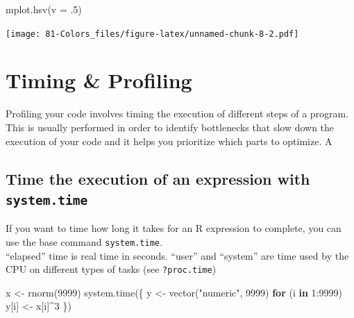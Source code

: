 \documentclass[
]{book}
\newenvironment{Shaded}{\begin{snugshade}}{\end{snugshade}}
\newcommand{\AttributeTok}[1]{\textcolor[rgb]{0.77,0.63,0.00}{#1}}
\newcommand{\ControlFlowTok}[1]{\textcolor[rgb]{0.13,0.29,0.53}{\textbf{#1}}}
\newcommand{\DecValTok}[1]{\textcolor[rgb]{0.00,0.00,0.81}{#1}}
\newcommand{\FunctionTok}[1]{\textcolor[rgb]{0.00,0.00,0.00}{#1}}
\newcommand{\NormalTok}[1]{#1}
\newcommand{\OtherTok}[1]{\textcolor[rgb]{0.56,0.35,0.01}{#1}}
\newcommand{\SpecialCharTok}[1]{\textcolor[rgb]{0.00,0.00,0.00}{#1}}
\newcommand{\StringTok}[1]{\textcolor[rgb]{0.31,0.60,0.02}{#1}}
\begin{document}
\begin{Shaded}
\begin{Highlighting}[]
\FunctionTok{mplot.hsv}\NormalTok{(}\AttributeTok{v =}\NormalTok{ .}\DecValTok{5}\NormalTok{)}
\end{Highlighting}
\end{Shaded}

\texttt{[image: 81-Colors\_files/figure-latex/unnamed-chunk-8-2.pdf]}

\hypertarget{profiling}{%
\chapter{Timing \& Profiling}\label{profiling}}

Profiling your code involves timing the execution of different steps of a program. This is usually performed in order to identify bottlenecks that slow down the execution of your code and it helps you prioritize which parts to optimize. A

\hypertarget{time-the-execution-of-an-expression-with-system.time}{%
\section{\texorpdfstring{Time the execution of an expression with \texttt{system.time}}{Time the execution of an expression with system.time}}\label{time-the-execution-of-an-expression-with-system.time}}

If you want to time how long it takes for an R expression to complete, you can use the base command \texttt{system.time}.\\
``elapsed'' time is real time in seconds. ``user'' and ``system'' are time used by the CPU on different types of tasks (see \texttt{?proc.time})

\begin{Shaded}
\begin{Highlighting}[]
\NormalTok{x }\OtherTok{\textless{}{-}} \FunctionTok{rnorm}\NormalTok{(}\DecValTok{9999}\NormalTok{)}
\FunctionTok{system.time}\NormalTok{(\{}
\NormalTok{    y }\OtherTok{\textless{}{-}} \FunctionTok{vector}\NormalTok{(}\StringTok{"numeric"}\NormalTok{, }\DecValTok{9999}\NormalTok{)}
    \ControlFlowTok{for}\NormalTok{ (i }\ControlFlowTok{in} \DecValTok{1}\SpecialCharTok{:}\DecValTok{9999}\NormalTok{) y[i] }\OtherTok{\textless{}{-}}\NormalTok{ x[i]}\SpecialCharTok{\^{}}\DecValTok{3}
\NormalTok{\})}
\end{Highlighting}
\end{Shaded}
\end{document}
